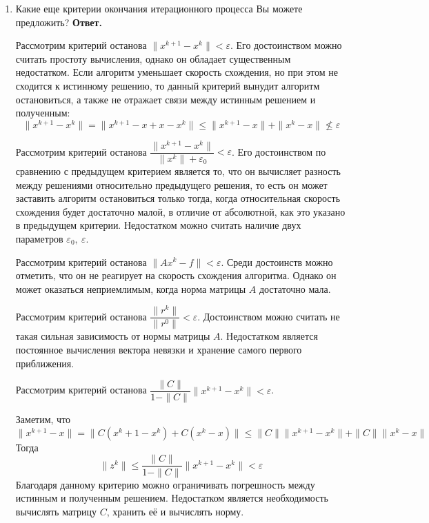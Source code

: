 \documentclass{article}
\begin{document}
\begin{enumerate}
        \item Какие еще критерии окончания итерационного процесса
        Вы можете предложить?
        \newline
        {\bfseries Ответ.}

        Рассмотрим критерий останова $\|x^{k+1} - x^k\| < \varepsilon$. Его достоинством
        можно считать простоту вычисления, однако он обладает существенным недостатком. Если 
        алгоритм уменьшает скорость схождения, но при этом не сходится к истинному решению, то данный 
        критерий вынудит алгоритм остановиться, а также не отражает связи между истинным решением и полученным: 
        \begin{equation*}
            \|x^{k+1} - x^k \| = \|x^{k+1} - x + x - x^k\| \leqslant \|x^{k+1} - x\| + \|x^k - x\| \not \leqslant \varepsilon   
        \end{equation*}

        Рассмотрим критерий останова 
        $\dfrac{\|x^{k+1} - x^k\| }{\|x^k\|+ \varepsilon_0} < \varepsilon$.
        Его достоинством по сравнению с предыдущем критерием является то, что 
        он вычисляет разность между решениями относительно предыдущего решения, то есть 
        он может заставить алгоритм остановиться только тогда, когда относительная скорость 
        схождения будет достаточно малой, в отличие от абсолютной, как это указано в предыдущем критерии.
        Недостатком можно считать наличие двух параметров $\varepsilon_0, \ \varepsilon$.

        Рассмотрим критерий останова $\|Ax^k - f \|< \varepsilon$. Среди достоинств можно отметить, что 
        он не реагирует на скорость схождения алгоритма. Однако он может оказаться неприемлимым, когда 
        норма матрицы $A$ достаточно мала.   

        Рассмотрим критерий останова $\dfrac{\|r^k\|}{\|r^0\|} < \varepsilon$. Достоинством можно считать 
        не такая сильная зависимость от нормы матрицы $A$. Недостатком является постоянное 
        вычисления вектора 
        невязки и хранение самого первого приближения. 

        Рассмотрим критерий останова $\dfrac{\|C\|}{1-\|C\|} \|x^{k+1} - x^k\| < \varepsilon$.
        
        Заметим, что 
        \begin{equation*}
            \|x^{k+1} - x\| = \|C(x^k+1 - x^k) + C(x^k - x)\| \leqslant
            \|C\| \|x^{k+1} - x^k\| + \| C\| \|x^k - x\|
        \end{equation*}
        Тогда
        \begin{equation*}
            \|z^k\| \leqslant \dfrac{\|C\|}{1-\|C\|} \|x^{k+1} - x^k\| < \varepsilon
        \end{equation*}
        Благодаря данному критерию можно ограничивать погрешность между истинным и полученным решением. 
        Недостатком является необходимость вычислять матрицу $C$, хранить её и вычислять норму. 


    \end{enumerate}
\end{document}
